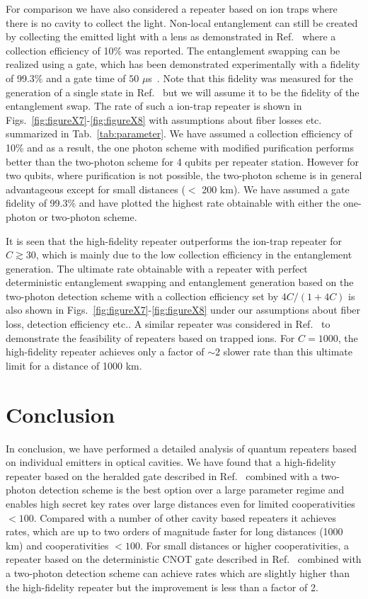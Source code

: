 For comparison we have also considered a repeater based on ion traps where there
is no cavity to collect the light. Non-local entanglement can still be created
by collecting the emitted light with a lens as demonstrated in
Ref.~\cite{monroe2014} where a collection efficiency of 10\% was reported. The
entanglement swapping can be realized using a gate, which has been demonstrated
experimentally with a fidelity of 99.3\% and a gate time of $50$
$\mu$s~\cite{blatt1}. Note that this fidelity was measured for the generation of
a single state in Ref.~\cite{blatt1} but we will assume it to be the fidelity of
the entanglement swap. The rate of such a ion-trap repeater is shown in
Figs.~\ref{fig:figureX7}-\ref{fig:figureX8} with assumptions about fiber losses
etc. summarized in Tab.~\ref{tab:parameter}. We have assumed a collection
efficiency of 10\% and as a result, the one photon scheme with modified
purification performs better than the two-photon scheme for 4 qubits per
repeater station. However for two qubits, where purification is not possible,
the two-photon scheme is in general advantageous except for small distances ($<$
200 km). We have assumed a gate fidelity of 99.3\% and have plotted the highest
rate obtainable with either the one-photon or two-photon scheme.

It is seen that the high-fidelity repeater outperforms the ion-trap repeater for
$C\gtrsim30$, which is mainly due to the low collection efficiency in the
entanglement generation. The ultimate rate obtainable with a repeater with
perfect deterministic entanglement swapping and entanglement generation based on
the two-photon detection scheme with a collection efficiency set by $4C/(1+4C)$
is also shown in Figs.~\ref{fig:figureX7}-\ref{fig:figureX8} under our
assumptions about fiber loss, detection efficiency etc.. A similar repeater was
considered in Ref.~\cite{sangouard2} to demonstrate the feasibility of repeaters
based on trapped ions. For $C=1000$, the high-fidelity repeater achieves only a
factor of $\sim2$ slower rate than this ultimate limit for a distance of 1000
km.

\section{Conclusion}        

In conclusion, we have performed a detailed analysis of quantum repeaters based
on individual emitters in optical cavities. We have found that a high-fidelity
repeater based on the heralded gate described in Ref.~\cite{Borregaard2015a} combined
with a two-photon detection scheme is the best option over a large parameter
regime and enables high secret key rates over large distances even for limited
cooperativities $<100$. Compared with a number of other cavity based repeaters
it achieves rates, which are up to two orders of magnitude faster for long
distances (1000 km) and cooperativities $<100$. For small distances or higher
cooperativities, a repeater based on the deterministic CNOT gate described in
Ref.~\cite{Anders2prl} combined with a two-photon detection scheme can achieve
rates which are slightly higher than the high-fidelity repeater but the
improvement is less than a factor of 2.

